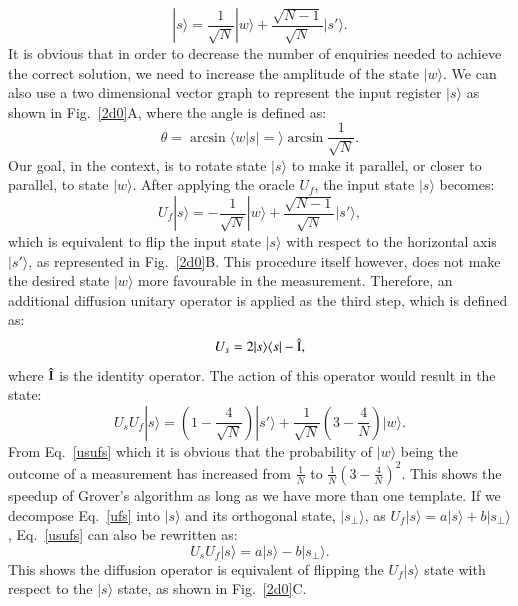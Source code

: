 \documentclass[aps,prd,nofootinbib,twocolumn,reprint,superscriptaddress,showpacs,showkeys,longbibliography]{revtex4-1}
\newcommand{\bra}[1]{\langle #1|}
\newcommand{\ket}[1]{|#1\rangle}
\newcommand{\braket}[2]{\langle #1|#2\rangle}
\begin{document}
\begin{equation}
    \label{so}
    \ket{s}=\frac{1}{\sqrt{N}}\ket{w}+\frac{\sqrt{N-1}}{\sqrt{N}}\ket{s'}.
\end{equation}
It is obvious that in order to decrease the number of enquiries needed to achieve the correct solution, we need to increase the amplitude of the state $\ket{w}$. We can also use a two dimensional vector graph to represent the input register $\ket{s}$ as shown in Fig.~\ref{2d0}A, where the angle is defined as:
\begin{equation}
\label{theta}
   \theta=\arcsin\braket{w|s}=\arcsin {\frac{1}{\sqrt{N}}}.
\end{equation}
Our goal, in the context, is to rotate state $\ket{s}$ to make it parallel, or closer to parallel, to state $\ket{w}$. After applying the oracle $U_f$, the input state $\ket{s}$ becomes:
\begin{equation}
    \label{ufs}
    U_f\ket{s}=-\frac{1}{\sqrt{N}}\ket{w}+\frac{\sqrt{N-1}}{\sqrt{N}}\ket{s'},
\end{equation}
which is equivalent to flip the input state $\ket{s}$ with respect to the horizontal axis $\ket{s'}$, as represented in Fig.~\ref{2d0}B. This procedure itself however, does not make the desired state $\ket{w}$ more favourable in the measurement. Therefore, an additional diffusion unitary operator is applied as the third step, which is defined as:
\begin{equation}
    \label{Us}
    U_s=2\ket{s}\bra{s}-\hat{\rm I},
\end{equation}
where $\hat{\rm I}$ is the identity operator. The action of this operator would result in the state:
\begin{equation}
    \label{usufs}
    U_sU_f\ket{s}=(1-\frac{4}{\sqrt{N}})\ket{s'}+\frac{1}{\sqrt{N}}(3-\frac{4}{N})\ket{w}.
\end{equation}
From Eq.~\ref{usufs} which it is obvious that the probability of $\ket{w}$ being the outcome of a measurement has increased from $\frac{1}{N}$ to $\frac{1}{N}(3-\frac{4}{N})^2$. This shows the speedup of Grover's algorithm as long as we have more than one template. If we decompose Eq.~\ref{ufs} into $\ket{s}$ and its orthogonal state, $\ket{s_\perp}$, as $U_f\ket{s}=a\ket{s}+b\ket{s_\perp}$, Eq.~\ref{usufs} can also be rewritten as:
\begin{equation}
    \label{usufsp}
    U_sU_f\ket{s}=a\ket{s}-b\ket{s_\perp}.
\end{equation}
This shows the diffusion operator is equivalent of flipping the $U_f\ket{s}$ state with respect to the $\ket{s}$ state, as shown in Fig.~\ref{2d0}C.
\end{document}
